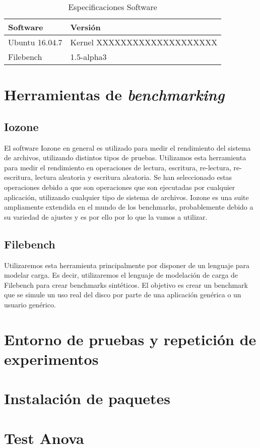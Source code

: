 \begin{table}
    \centering
    \begin{tabular}{|l|l|}
    \hline
        Software & Versión \\ \hline\hline
        Ubuntu 16.04.7 & Kernel XXXXXXXXXXXXXXXXXXXX \\ \hline
        Filebench & 1.5-alpha3 \\ \hline
    \end{tabular}
    \caption{Especificaciones Software}
\label{table:2}
\end{table}

\section{Herramientas de \textit{benchmarking}}
\subsection{Iozone}
El software Iozone en general es utilizado para medir el rendimiento del sistema de archivos, utilizando distintos tipos de pruebas. Utilizamos esta herramienta para medir el rendimiento en operaciones de lectura, escritura, re-lectura, re-escritura, lectura aleatoria y escritura aleatoria. Se han seleccionado estas operaciones debido a que son operaciones que son ejecutadas por cualquier aplicación, utilizando cualquier tipo de sistema de archivos. Iozone es una suite ampliamente extendida en el mundo de los benchmarks, probablemente debido a su variedad de ajustes y es por ello por lo que la vamos a utilizar.
\subsection{Filebench}
Utilizaremos esta herramienta principalmente por disponer de un lenguaje para modelar carga. Es decir, utilizaremos el lenguaje de modelación de carga de Filebench para crear benchmarks sintéticos. El objetivo es crear un benchmark que se simule un uso real del disco por parte de una aplicación genérica o un usuario genérico. 
\section{Entorno de pruebas y repetición de experimentos}
\section{Instalación de paquetes}
\section{Test Anova}



